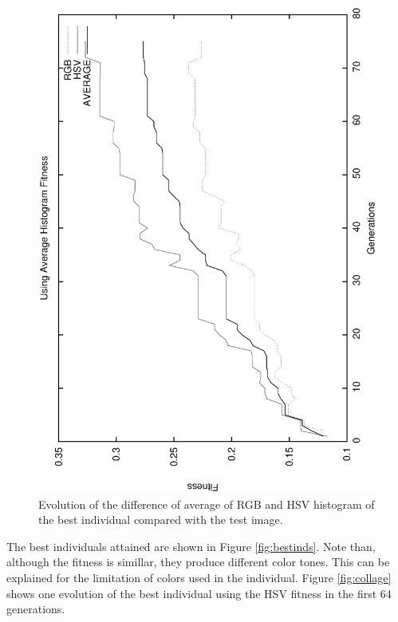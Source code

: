 \documentclass[conference]{IEEEtran}
\begin{document}
\begin{figure}
   \includegraphics[angle=-90,scale =0.35] {images/averagegens.eps}
\caption{Evolution of the difference of average of RGB and HSV histogram of the best individual compared with the test image. }
\label{fig:averagegens}
\end{figure}

The best individuals attained are shown in Figure \ref{fig:bestinds}. Note than, although the fitness is simillar, they produce different color tones. This can be explained for the limitation of colors used in the individual. Figure \ref{fig:collage} shows one evolution of the best individual using the HSV fitness in the first 64 generations.
\end{document}
